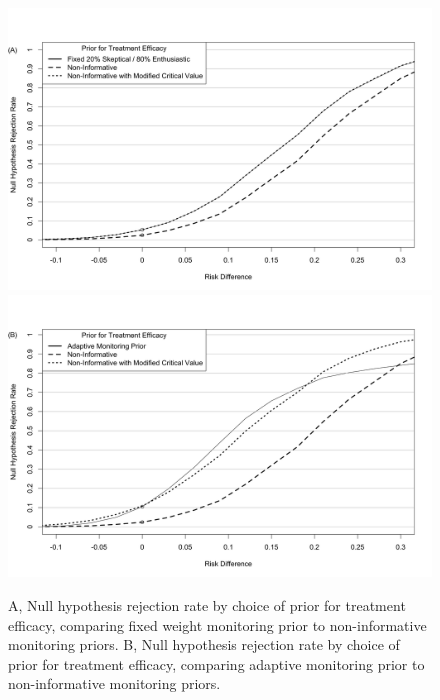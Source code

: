 \documentclass[12pt]{article}
\begin{document}
\begin{figure}[htbp]
\begin{center}
\includegraphics[width=5.5in]{./figures/7A.png}
   \includegraphics[width=5.5in]{./figures/7B.png}
    \caption{A, Null hypothesis rejection rate by choice of prior for treatment efficacy, comparing fixed weight monitoring prior to non-informative monitoring priors. B, Null hypothesis rejection rate by choice of prior for treatment efficacy, comparing adaptive monitoring prior to non-informative monitoring priors.}
\label{fig:adaptive-vs-ni}
 \end{center}
\end{figure}
\end{document}
